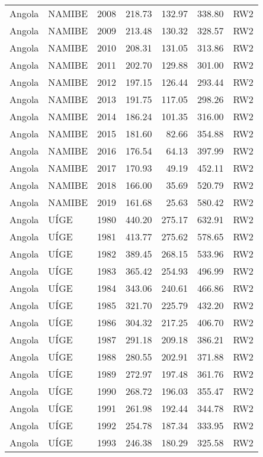 \begin{longtable}{lllrrrl}
  Angola & NAMIBE & 2008 & 218.73 & 132.97 & 338.80 & RW2 \\ 
  Angola & NAMIBE & 2009 & 213.48 & 130.32 & 328.57 & RW2 \\ 
  Angola & NAMIBE & 2010 & 208.31 & 131.05 & 313.86 & RW2 \\ 
  Angola & NAMIBE & 2011 & 202.70 & 129.88 & 301.00 & RW2 \\ 
  Angola & NAMIBE & 2012 & 197.15 & 126.44 & 293.44 & RW2 \\ 
  Angola & NAMIBE & 2013 & 191.75 & 117.05 & 298.26 & RW2 \\ 
  Angola & NAMIBE & 2014 & 186.24 & 101.35 & 316.00 & RW2 \\ 
  Angola & NAMIBE & 2015 & 181.60 & 82.66 & 354.88 & RW2 \\ 
  Angola & NAMIBE & 2016 & 176.54 & 64.13 & 397.99 & RW2 \\ 
  Angola & NAMIBE & 2017 & 170.93 & 49.19 & 452.11 & RW2 \\ 
  Angola & NAMIBE & 2018 & 166.00 & 35.69 & 520.79 & RW2 \\ 
  Angola & NAMIBE & 2019 & 161.68 & 25.63 & 580.42 & RW2 \\ 
  Angola & UÍGE & 1980 & 440.20 & 275.17 & 632.91 & RW2 \\ 
  Angola & UÍGE & 1981 & 413.77 & 275.62 & 578.65 & RW2 \\ 
  Angola & UÍGE & 1982 & 389.45 & 268.15 & 533.96 & RW2 \\ 
  Angola & UÍGE & 1983 & 365.42 & 254.93 & 496.99 & RW2 \\ 
  Angola & UÍGE & 1984 & 343.06 & 240.61 & 466.86 & RW2 \\ 
  Angola & UÍGE & 1985 & 321.70 & 225.79 & 432.20 & RW2 \\ 
  Angola & UÍGE & 1986 & 304.32 & 217.25 & 406.70 & RW2 \\ 
  Angola & UÍGE & 1987 & 291.18 & 209.18 & 386.21 & RW2 \\ 
  Angola & UÍGE & 1988 & 280.55 & 202.91 & 371.88 & RW2 \\ 
  Angola & UÍGE & 1989 & 272.97 & 197.48 & 361.76 & RW2 \\ 
  Angola & UÍGE & 1990 & 268.72 & 196.03 & 355.47 & RW2 \\ 
  Angola & UÍGE & 1991 & 261.98 & 192.44 & 344.78 & RW2 \\ 
  Angola & UÍGE & 1992 & 254.78 & 187.34 & 333.95 & RW2 \\ 
  Angola & UÍGE & 1993 & 246.38 & 180.29 & 325.58 & RW2 \\ 

\end{longtable}
